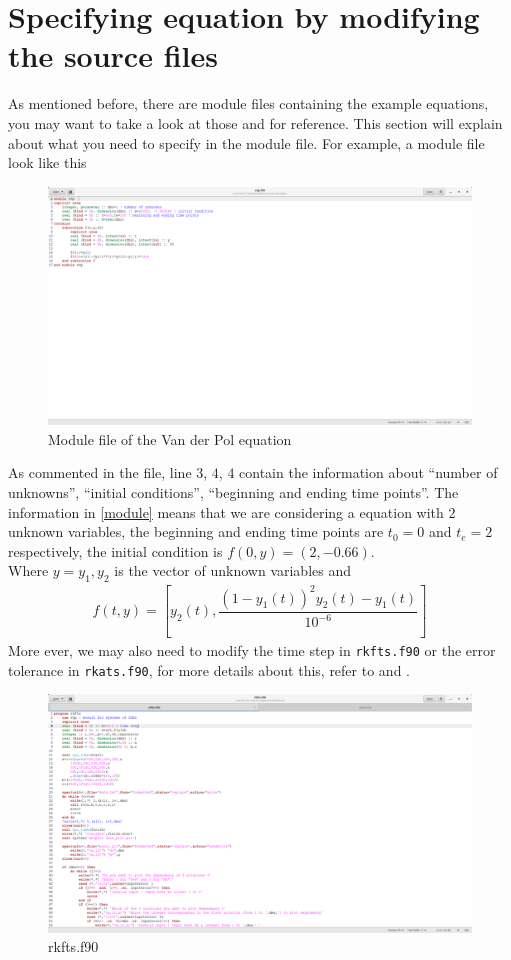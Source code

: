 \documentclass[a4paper,oneside]{book}
\numberwithin{equation}{chapter}
\begin{document}
	\section{Specifying equation by modifying the source files}
	As mentioned before, there are module files containing the example equations, you may want to take a look at those and \cite{user3} for reference. This section will explain about what you need to specify in the module file. For example, a module file look like this
	\begin{figure}[H]
		\centering	\includegraphics[width=15cm]{wfig0}
		\caption{Module file of the Van der Pol equation}
		\label{module}
	\end{figure}
	\noindent As commented in the file, line $3$, $4$, $4$ contain the information about ``number of unknowns'', ``initial conditions'', ``beginning and ending time points''. The information in \autoref{module} means that we are considering a equation with $2$ unknown variables, the beginning and ending time points are $t_0=0$ and $t_e=2$ respectively, the initial condition is $f(0,y)=(2,-0.66)$.\\
	Where $y=y_1,y_2$ is the vector of unknown variables and 
	\begin{align}
		f(t,y)=\left[y_2(t) , \dfrac{\left(1-y_1(t)\right)^2y_2(t)-y_1(t)}{10^{-6}}\right]
	\end{align}
	\noindent More ever, we may also need to modify the time step in \texttt{rkfts.f90} or the error tolerance in \texttt{rkats.f90}, for more details about this, refer to \cite{user1} and \cite{user2}.
	\begin{figure}[H]
		\centering	\includegraphics[width=15cm]{wfig01}
		\caption{rkfts.f90}
	\end{figure}
\end{document}

